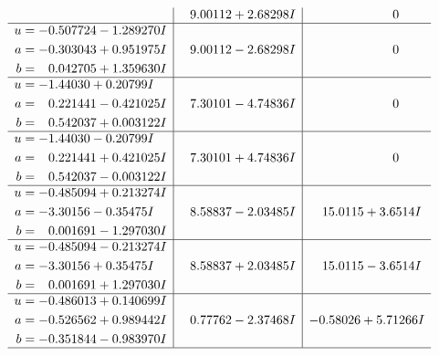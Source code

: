 \documentclass[1p]{elsarticle_modified}
\theoremstyle{definition}
\begin{document}
$$\begin{array}{c|c|c}
 & \phantom{-}9.00112 + 2.68298 I & \phantom{-0.000000 } 0 \\ \hline\begin{aligned}
u &= -0.507724 - 1.289270 I \\
a &= -0.303043 + 0.951975 I \\
b &= \phantom{-}0.042705 + 1.359630 I\end{aligned}
 & \phantom{-}9.00112 - 2.68298 I & \phantom{-0.000000 } 0 \\ \hline\begin{aligned}
u &= -1.44030 + 0.20799 I \\
a &= \phantom{-}0.221441 - 0.421025 I \\
b &= \phantom{-}0.542037 + 0.003122 I\end{aligned}
 & \phantom{-}7.30101 - 4.74836 I & \phantom{-0.000000 } 0 \\ \hline\begin{aligned}
u &= -1.44030 - 0.20799 I \\
a &= \phantom{-}0.221441 + 0.421025 I \\
b &= \phantom{-}0.542037 - 0.003122 I\end{aligned}
 & \phantom{-}7.30101 + 4.74836 I & \phantom{-0.000000 } 0 \\ \hline\begin{aligned}
u &= -0.485094 + 0.213274 I \\
a &= -3.30156 - 0.35475 I \\
b &= \phantom{-}0.001691 - 1.297030 I\end{aligned}
 & \phantom{-}8.58837 - 2.03485 I & \phantom{-}15.0115 + 3.6514 I \\ \hline\begin{aligned}
u &= -0.485094 - 0.213274 I \\
a &= -3.30156 + 0.35475 I \\
b &= \phantom{-}0.001691 + 1.297030 I\end{aligned}
 & \phantom{-}8.58837 + 2.03485 I & \phantom{-}15.0115 - 3.6514 I \\ \hline\begin{aligned}
u &= -0.486013 + 0.140699 I \\
a &= -0.526562 + 0.989442 I \\
b &= -0.351844 - 0.983970 I\end{aligned}
 & \phantom{-}0.77762 - 2.37468 I & -0.58026 + 5.71266 I\\
 \hline 
 \end{array}$$\newpage$$\begin{array}{c|c|c}  

\end{array}$$
\end{document}
